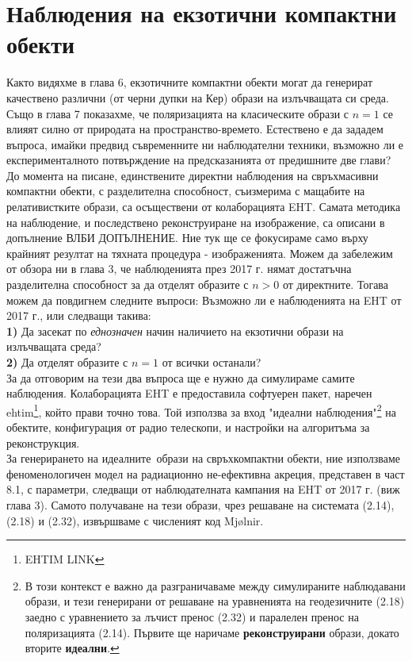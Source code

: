 \section{Наблюдения на екзотични компактни обекти}
Както видяхме в глава 6, екзотичните компактни обекти могат да генерират качествено различни (от черни дупки на Кер) образи на излъчващата си среда. Също в глава 7 показахме, че поляризацията на класическите образи с $n = 1$ се влияят силно от природата на пространство-времето. Естествено е да зададем въпроса, имайки предвид съвременните ни наблюдателни техники, възможно ли е експерименталното потвърждение на предсказанията от предишните две глави?\\

До момента на писане, единствените директни наблюдения на свръхмасивни компактни обекти, с разделителна способност, съизмерима с мащабите на релативистките образи, са осъществени от колаборацията EHT. Самата методика на наблюдение, и последствено реконструиране на изображение, са описани в допълнение ВЛБИ ДОПЪЛНЕНИЕ. Ние тук ще се фокусираме само върху крайният резултат на тяхната процедура - изображенията. Можем да забележим от обзора ни в глава 3, че наблюденията през 2017 г. нямат достатъчна разделителна способност за да отделят образите с $n > 0 $ от директните. Тогава можем да повдигнем следните въпроси: Възможно ли е наблюденията на EHT от 2017 г., или следващи такива:\\

\textbf{1)} Да засекат по \emph{еднозначен} начин наличието на екзотични образи на излъчващата среда?\\

\textbf{2)} Да отделят образите с $n = 1$ от всички останали?\\

За да отговорим на тези два въпроса ще е нужно да симулираме самите наблюдения. Колаборацията EHT е предоставила софтуерен пакет, наречен ehtim\footnote{EHTIM LINK}, който прави точно това. Той използва за вход "идеални наблюдения"\footnote{В този контекст е важно да разграничаваме между симулираните наблюдавани образи, и тези генерирани от решаване на уравненията на геодезичните (2.18) заедно с уравнението за лъчист пренос (2.32) и паралелен пренос на поляризацията (2.14). Първите ще наричаме \textbf{реконструирани} образи, докато вторите \textbf{идеални}.} на обектите, конфигурация от радио телескопи, и настройки на алгоритъма за реконструкция. \\

За генерирането на идеалните$\,$ образи на свръхкомпактни обекти, ние използваме феноменологичен модел на радиационно не-ефективна акреция, представен в част 8.1, с параметри, следващи от наблюдателната кампания на EHT от 2017 г. (виж глава 3). Самото получаване на тези образи, чрез решаване на системата (2.14), (2.18) и (2.32), извършваме с численият код Mjølnir. \\

